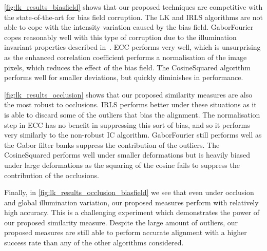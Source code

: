 \cref{fig:lk_results_biasfield} shows that our proposed techniques are
competitive with the state-of-the-art for bias field corruption. The LK and IRLS
algorithms are not able to cope with the intensity variation caused by the bias
field. GaborFourier copes reasonably well with this type of corruption due to
the illumination invariant properties described in~\cite{RefWorks:73}. ECC
performs very well, which is unsurprising as the enhanced correlation
coefficient performs a normalisation of the image pixels, which reduces the
effect of the bias field. The CosineSquared algorithm performs well for smaller
deviations, but quickly diminishes in performance.

\cref{fig:lk_results_occlusion} shows that our proposed similarity
measures are also the most robust to occlusions. IRLS performs better under
these situations as it is able to discard some of the outliers that bias the
alignment. The normalisation step in ECC has no benefit in suppressing this sort
of bias, and so it performs very similarly to the non-robust IC algorithm.
GaborFourier still performs well as the Gabor filter banks suppress the
contribution of the outliers. The CosineSquared performs well under smaller
deformations but is heavily biased under large deformations as the squaring of
the cosine fails to suppress the contribution of the occlusions.

Finally, in \cref{fig:lk_results_occlusion_biasfield} we see that even
under occlusion and global illumination variation, our proposed measures perform
with relatively high accuracy. This is a challenging experiment which
demonstrates the power of our proposed similarity measure. Despite the large
amount of outliers, our proposed measures are still able to perform accurate
alignment with a higher success rate than any of the other algorithms
considered.
